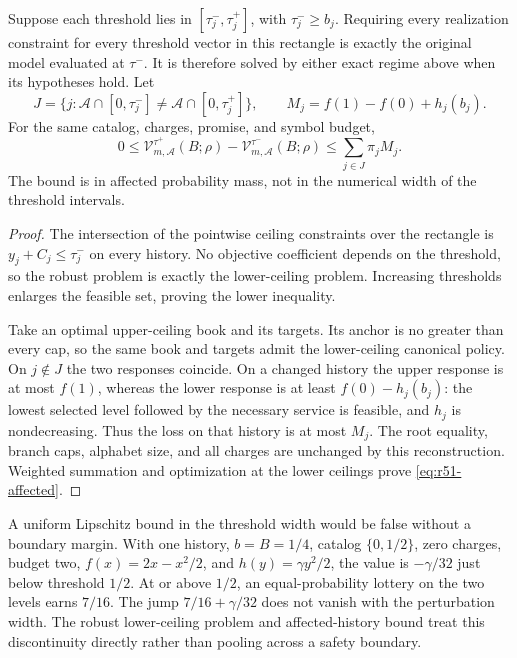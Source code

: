 \begin{theorem}\label{thm:r51-uncertainty}
Suppose each threshold lies in $[\tau_j^-,\tau_j^+]$, with $\tau_j^-\geq b_j$. Requiring every realization constraint for every threshold vector in this rectangle is exactly the original model evaluated at $\tau^-$. It is therefore solved by either exact regime above when its hypotheses hold. Let
\[
 J=\{j:\mathcal A\cap[0,\tau_j^-]\ne\mathcal A\cap[0,\tau_j^+]\},
 \qquad M_j=f(1)-f(0)+h_j(b_j).
\]
For the same catalog, charges, promise, and symbol budget,
\begin{equation}\label{eq:r51-affected}
 0\leq\mathcal V_{m,\mathcal A}^{\tau^+}(B;\rho)
       -\mathcal V_{m,\mathcal A}^{\tau^-}(B;\rho)
 \leq\sum_{j\in J}\pi_j M_j.
\end{equation}
The bound is in affected probability mass, not in the numerical width of the threshold intervals.
\end{theorem}
\begin{proof}
The intersection of the pointwise ceiling constraints over the rectangle is $y_j+C_j\leq\tau_j^-$ on every history. No objective coefficient depends on the threshold, so the robust problem is exactly the lower-ceiling problem. Increasing thresholds enlarges the feasible set, proving the lower inequality.

Take an optimal upper-ceiling book and its targets. Its anchor is no greater than every cap, so the same book and targets admit the lower-ceiling canonical policy. On $j\notin J$ the two responses coincide. On a changed history the upper response is at most $f(1)$, whereas the lower response is at least $f(0)-h_j(b_j)$: the lowest selected level followed by the necessary service is feasible, and $h_j$ is nondecreasing. Thus the loss on that history is at most $M_j$. The root equality, branch caps, alphabet size, and all charges are unchanged by this reconstruction. Weighted summation and optimization at the lower ceilings prove \eqref{eq:r51-affected}.
\end{proof}

A uniform Lipschitz bound in the threshold width would be false without a boundary margin. With one history, $b=B=1/4$, catalog $\{0,1/2\}$, zero charges, budget two, $f(x)=2x-x^2/2$, and $h(y)=\gamma y^2/2$, the value is $-\gamma/32$ just below threshold $1/2$. At or above $1/2$, an equal-probability lottery on the two levels earns $7/16$. The jump $7/16+\gamma/32$ does not vanish with the perturbation width. The robust lower-ceiling problem and affected-history bound treat this discontinuity directly rather than pooling across a safety boundary.

